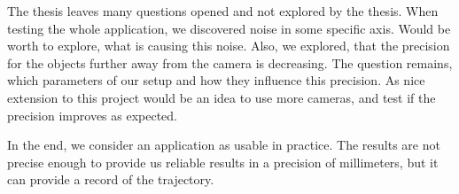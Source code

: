 The thesis leaves many questions opened and not explored by the thesis. When
testing the whole application, we discovered noise in some specific axis. Would
be worth to explore, what is causing this noise. Also, we explored, that the
precision for the objects further away from the camera is decreasing. The
question remains, which parameters of our setup and how they influence this
precision. As nice extension to this project would be an idea to use more
cameras, and test if the precision improves as expected.

In the end, we consider an application as usable in practice. The results are
not precise enough to provide us reliable results in a precision of
millimeters, but it can provide a record of the trajectory.

